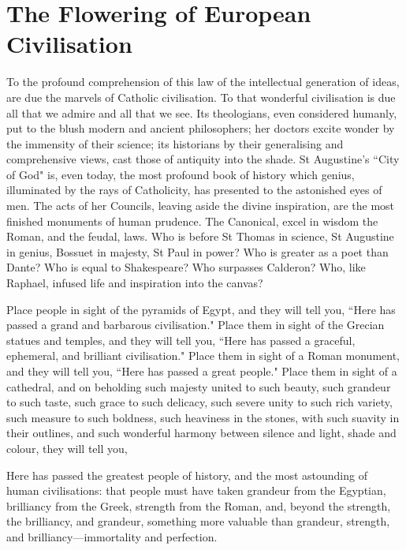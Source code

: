 \section{The Flowering of European Civilisation}

\label{sec:FloweringEuropean}

To the profound comprehension of this law of the intellectual generation of ideas, are due the marvels of Catholic civilisation. To that wonderful civilisation is due all that we admire and all that we see. Its theologians, even considered humanly, put to the blush modern and ancient philosophers; her doctors excite wonder by the immensity of their science; its historians by their generalising and comprehensive views, cast those of antiquity into the shade. St Augustine's ``City of God" is, even today, the most profound book of history which genius, illuminated by the rays of Catholicity, has presented to the astonished eyes of men. The acts of her Councils, leaving aside the divine inspiration, are the most finished monuments of human prudence. The Canonical, excel in wisdom the Roman, and the feudal, laws. Who is before St Thomas in science, St Augustine in genius, Bossuet in majesty, St Paul in power? Who is greater as a poet than Dante? Who is equal to Shakespeare? Who surpasses Calderon? Who, like Raphael, infused life and inspiration into the canvas? 

Place people in sight of the pyramids of Egypt, and they will tell you, ``Here has passed a grand and barbarous civilisation." Place them in sight of the Grecian statues and temples, and they will tell you, ``Here has passed a graceful, ephemeral, and brilliant civilisation." Place them in sight of a Roman monument, and they will tell you, ``Here has passed a great people." Place them in sight of a cathedral, and on beholding such majesty united to such beauty, such grandeur to such taste, such grace to such delicacy, such severe unity to such rich variety, such measure to such boldness, such heaviness in the stones, with such suavity in their outlines, and such wonderful harmony between silence and light, shade and colour, they will tell you, 

Here has passed the greatest people of history, and the most astounding of human civilisations: that people must have taken grandeur from the Egyptian, brilliancy from the Greek, strength from the Roman, and, beyond the strength, the brilliancy, and grandeur, something more valuable than grandeur, strength, and brilliancy—immortality and perfection. 


